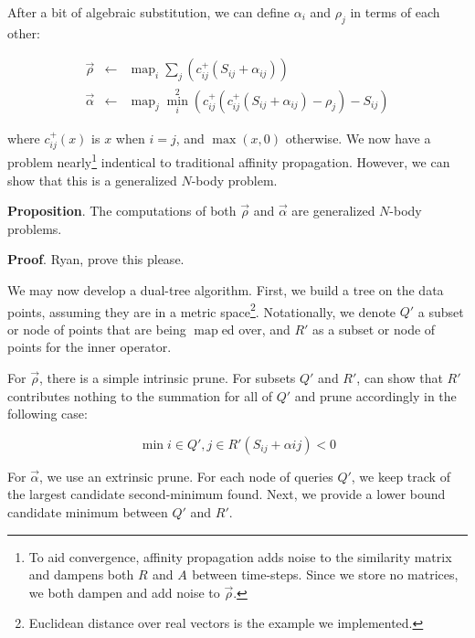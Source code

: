 \documentclass[times, 10pt]{article}
\DeclareMathOperator*{\map}{map}
\newcommand{\eqspace}{\!\!\!\!}
\newcommand{\cposij}{c^{+}_{ij}}
\newcommand{\respo}[2]{R_{#1#2}}
\newcommand{\avail}[2]{A_{#1#2}}
\newcommand{\simil}[2]{S_{#1#2}}
\newcommand{\vecrho}{\vec{\rho}}
\newcommand{\vecalpha}{\vec{\alpha}}
\newcommand{\frho}[1]{\rho_{#1}}
\newcommand{\falpha}[2]{\alpha_{#1#2}}
\begin{document}
\noindent 
After a bit of algebraic substitution, we can define $\falpha{i}{}$ and $\frho{j}$ in terms of each other:

\begin{eqnarray*}
  \vecrho \eqspace&\gets&\eqspace \map_{i} \sum_{j} \left( \cposij(\simil{i}{j} + \falpha{i}{j}) \right)
  \\
  \vecalpha \eqspace&\gets&\eqspace \map_{j} \min^2_{i} \left( \cposij(\cposij(\simil{i}{j} + \falpha{i}{j}) - \frho{j}) - \simil{i}{j} \right)
\end{eqnarray*}

\noindent where $\cposij(x)$ is $x$ when $i=j$, and $\max(x,0)$ otherwise.
We now have a problem nearly\footnote{To aid convergence, affinity propagation adds noise to the similarity matrix and dampens both $\respo{}{}$ and $\avail{}{}$ between time-steps.  Since we store no matrices, we both dampen and add noise to $\vecrho$.} indentical to traditional affinity propagation.
However, we can show that this is a generalized $N$-body problem.

{\bf Proposition}.
The computations of both $\vecrho$ and $\vecalpha$ are generalized $N$-body problems.

{\bf Proof}.
Ryan, prove this please.

We may now develop a dual-tree algorithm.
First, we build a tree on the data points, assuming they are in a metric space\footnote{Euclidean distance over real vectors is the example we implemented.}.
Notationally, we denote $Q'$ a subset or node of points that are being $\map$ed over, and $R'$ as a subset or node of points for the inner operator.

For $\vecrho$, there is a simple intrinsic prune.
For subsets $Q'$ and $R'$, can show that $R'$ contributes nothing to the summation for all of $Q'$ and prune accordingly in the following case:

$$\min{i \in Q', j \in R'} \left( \simil{i}{j} + \alpha{i}{j} \right) < 0$$

For $\vecalpha$, we use an extrinsic prune.
For each node of queries $Q'$, we keep track of the largest candidate second-minimum found.
Next, we provide a lower bound candidate minimum between $Q'$ and $R'$.
\end{document}
